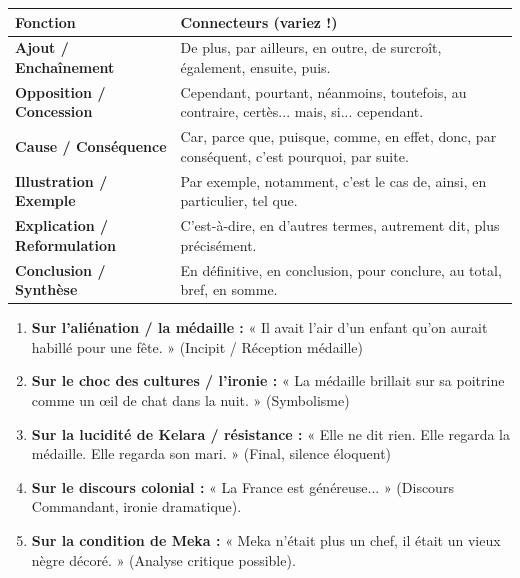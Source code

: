 \documentclass[11pt]{article}
\begin{document}
\begin{definition}
\begin{center}
\begin{tabularx}{\linewidth}{|l|X|}\hline
\textbf{Fonction} & \textbf{Connecteurs (variez !)} \\ \hline
\bfseries Ajout / Enchaînement & De plus, par ailleurs, en outre, de surcroît, également, ensuite, puis. \\ \hline
\bfseries Opposition / Concession & Cependant, pourtant, néanmoins, toutefois, au contraire, certès... mais, si... cependant. \\ \hline
\bfseries Cause / Conséquence & Car, parce que, puisque, comme, en effet, donc, par conséquent, c'est pourquoi, par suite. \\ \hline
\bfseries Illustration / Exemple & Par exemple, notamment, c'est le cas de, ainsi, en particulier, tel que. \\ \hline
\bfseries Explication / Reformulation & C'est-à-dire, en d'autres termes, autrement dit, plus précisément. \\ \hline
\bfseries Conclusion / Synthèse & En définitive, en conclusion, pour conclure, au total, bref, en somme. \\ \hline
\end{tabularx}
\end{center}
\end{definition}

\begin{definition}
\begin{enumerate}
    \item \textbf{Sur l'aliénation / la médaille :} « Il avait l'air d'un enfant qu'on aurait habillé pour une fête. » (Incipit / Réception médaille)
    \item \textbf{Sur le choc des cultures / l'ironie :} « La médaille brillait sur sa poitrine comme un œil de chat dans la nuit. » (Symbolisme)
    \item \textbf{Sur la lucidité de Kelara / résistance :} « Elle ne dit rien. Elle regarda la médaille. Elle regarda son mari. » (Final, silence éloquent)
    \item \textbf{Sur le discours colonial :} « La France est généreuse... » (Discours Commandant, ironie dramatique).
    \item \textbf{Sur la condition de Meka :} « Meka n'était plus un chef, il était un vieux nègre décoré. » (Analyse critique possible).
\end{enumerate}
\end{definition}
\end{document}
